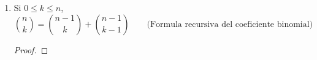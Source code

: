 \begin{enumerate}[label=\alph*)]
  \item Si $0\leq k \leq n$, \[\binom{n}{k} = \binom{n-1}{k} + \binom{n-1}{k-1}\qquad \text{(Formula recursiva del coeficiente binomial)}\]
  \begin{proof}\leavevmode
      

\end{proof}
\end{enumerate}
